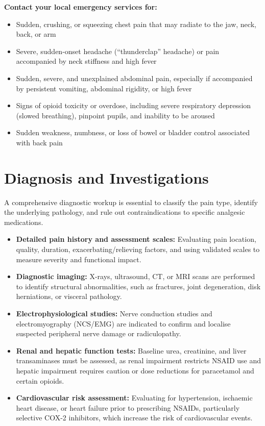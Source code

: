 \textbf{Contact your local emergency services for:}
\begin{itemize}
    \item Sudden, crushing, or squeezing chest pain that may radiate to the jaw, neck, back, or arm
    \item Severe, sudden-onset headache (``thunderclap'' headache) or pain accompanied by neck stiffness and high fever
    \item Sudden, severe, and unexplained abdominal pain, especially if accompanied by persistent vomiting, abdominal rigidity, or high fever
    \item Signs of opioid toxicity or overdose, including severe respiratory depression (slowed breathing), pinpoint pupils, and inability to be aroused
    \item Sudden weakness, numbness, or loss of bowel or bladder control associated with back pain
\end{itemize}

\section*{Diagnosis and Investigations}
A comprehensive diagnostic workup is essential to classify the pain type, identify the underlying pathology, and rule out contraindications to specific analgesic medications.
\begin{itemize}
    \item \textbf{Detailed pain history and assessment scales:} Evaluating pain location, quality, duration, exacerbating/relieving factors, and using validated scales to measure severity and functional impact.
    \item \textbf{Diagnostic imaging:} X-rays, ultrasound, CT, or MRI scans are performed to identify structural abnormalities, such as fractures, joint degeneration, disk herniations, or visceral pathology.
    \item \textbf{Electrophysiological studies:} Nerve conduction studies and electromyography (NCS/EMG) are indicated to confirm and localise suspected peripheral nerve damage or radiculopathy.
    \item \textbf{Renal and hepatic function tests:} Baseline urea, creatinine, and liver transaminases must be assessed, as renal impairment restricts NSAID use and hepatic impairment requires caution or dose reductions for paracetamol and certain opioids.
    \item \textbf{Cardiovascular risk assessment:} Evaluating for hypertension, ischaemic heart disease, or heart failure prior to prescribing NSAIDs, particularly selective COX-2 inhibitors, which increase the risk of cardiovascular events.
\end{itemize}

